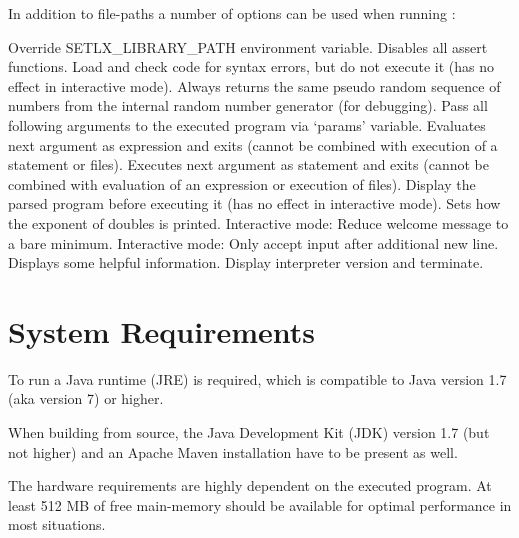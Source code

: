 In addition to file-paths a number of options can be used when running \setlX{}:

\begin{itemize}
	      {Override SETLX\_LIBRARY\_PATH environment variable.}
	      {Disables all assert functions.}
	      {Load and check code for syntax errors, but do not execute it (has no effect in interactive mode).}
	      {Always returns the same pseudo random sequence of numbers from the internal random number generator (for debugging).}
	      {Pass all following arguments to the executed program via `params' variable.}
	      {Evaluates next argument as expression and exits (cannot be combined with execution of a statement or files).}
	      {Executes next argument as statement and exits (cannot be combined with evaluation of an expression or execution of files).}
          {Display the parsed program before executing it (has no effect in interactive mode).}
          {Sets how the exponent of doubles is printed.}
	      {Interactive mode: Reduce welcome message to a bare minimum.}
	      {Interactive mode: Only accept input after additional new line.}
	      {Displays some helpful information.}
          {Display interpreter version and terminate.}
\end{itemize}

\section{System Requirements}

To run \setlX{} a Java runtime (JRE) is required, which is compatible to Java version 1.7 (aka version 7) or higher.

When building from source, the Java Development Kit (JDK) version 1.7 (but not higher) and an Apache Maven installation have to be present as well.

The hardware requirements are highly dependent on the executed \SetlX{} program. At least 512 MB of free main-memory should be available for optimal performance in most situations.

